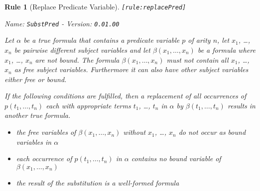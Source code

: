 \documentclass[a4paper,german,10pt,twoside]{book}
\newtheorem{rul}{Rule}
\theoremstyle{definition}
\theoremstyle{remark}
\begin{document}
\begin{rul}[Replace Predicate Variable]
\label{rule:replacePred} \hypertarget{rule:replacePred}{}
{\tt \tiny [\verb]rule:replacePred]]}

\par
{\em   Name: \verb]SubstPred]  -  Version: \verb]0.01.00]}


Let $\alpha$ be a true formula that contains a predicate variable $p$ of arity $n$, let $x_1$, \ldots, $x_n$ be pairwise different subject variables and let $\beta(x_1, \ldots, x_n)$ be a formula where $x_1$, \ldots, $x_n$ are not bound. The formula $\beta(x_1, \ldots, x_n)$ must not contain all $x_1$, \ldots, $x_n$ as free subject variables. Furthermore it can also have other subject variables either free or bound.

If the following conditions are fulfilled, then a replacement of all occurrences of $p(t_1, \ldots, t_n)$ each with appropriate terms $t_1$, \ldots, $t_n$ in $\alpha$ by $\beta(t_1, \ldots, t_n)$ results in another true formula.

\begin{itemize}

\item
the free variables of $\beta(x_1, \ldots, x_n)$ without $x_1$, \ldots, $x_n$ do not occur as bound variables in $\alpha$ 

\item 
each occurrence of $p(t_1, \ldots, t_n)$ in $\alpha$ contains no bound variable of $\beta(x_1, \ldots, x_n)$ 

\item
the result of the substitution is a well-formed formula

\end{itemize}
\end{rul}
\end{document}
